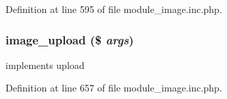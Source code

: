Definition at line 595 of file module\_\-image.inc.php.

\hypertarget{module__image_8inc_8php_a37dee9de60e2852c0631d8e60e58585c}{
\subsubsection[{image\_\-upload}]{\setlength{\rightskip}{0pt plus 5cm}image\_\-upload (\$ {\em args})}}
\label{module__image_8inc_8php_a37dee9de60e2852c0631d8e60e58585c}
implements upload 

Definition at line 657 of file module\_\-image.inc.php.

